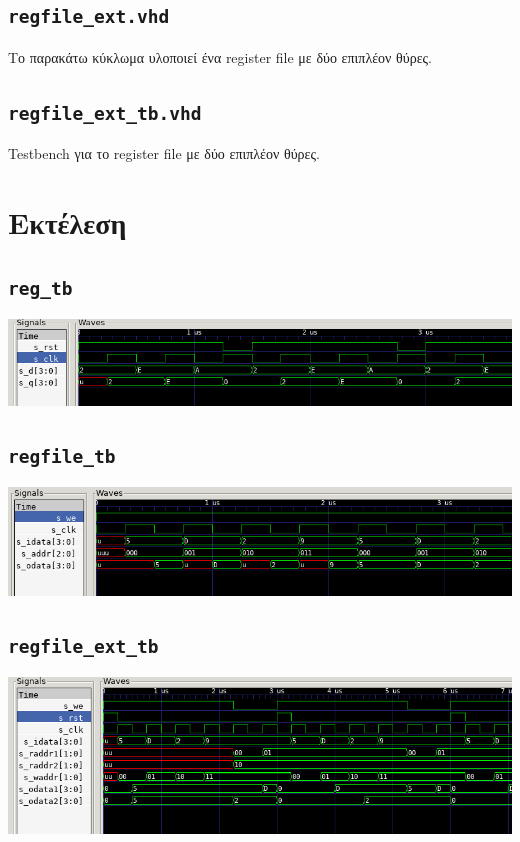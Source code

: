\documentclass{article}
\begin{document}
\subsection{\lstinline{regfile_ext.vhd}}

Το παρακάτω κύκλωμα υλοποιεί ένα register file με δύο επιπλέον θύρες. \\


\pagebreak

\subsection{\lstinline{regfile_ext_tb.vhd}}

Testbench για το register file με δύο επιπλέον θύρες. \\


\pagebreak

\section{Εκτέλεση}

\subsection{\lstinline{reg_tb}}
\includegraphics[width=\textwidth]{res/reg.png}

\subsection{\lstinline{regfile_tb}}
\includegraphics[width=\textwidth]{res/regfile.png}

\subsection{\lstinline{regfile_ext_tb}}
\includegraphics[width=\textwidth]{res/regfile_ext.png}
\end{document}
